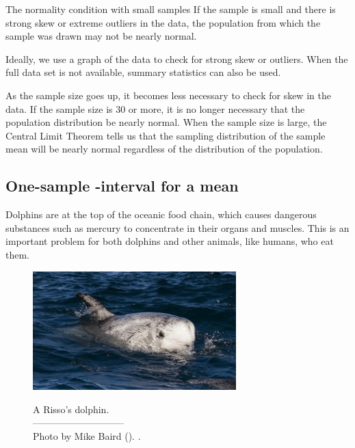 \begin{onebox}{The normality condition with small samples}
{If the sample is small and there is strong skew or extreme outliers in the data, the population from which the sample was drawn may not be nearly normal. }
\end{onebox}

Ideally, we use a graph of the data to check for strong skew or outliers.  When the full data set is not available, summary statistics can also be used. 

As the sample size goes up, it becomes less necessary to check for skew in the data.  If the sample size is 30 or more, it is no longer necessary that the population distribution be nearly normal.  When the sample size is large, the Central Limit Theorem tells us that the sampling distribution of the sample mean will be nearly normal regardless of the distribution of the population.



\subsection[One-sample $t$-interval for a mean]{One-sample -interval for a mean}
\label{oneSampleTConfidenceIntervals}


Dolphins are at the top of the oceanic food chain, which causes dangerous substances such as mercury to concentrate in their organs and muscles. This is an important problem for both dolphins and other animals, like humans, who eat them.
\setlength{\captionwidth}{86mm}

\begin{figure}[h]
\centering
\includegraphics[width=0.7\textwidth]{ch_inference_for_means/figures/rissosDolphin/rissosDolphin.jpg}  \\
\addvspace{2mm}
\begin{minipage}{\textwidth}
   \caption[rissosDolphinPic]{A Risso's dolphin.\vspace{-1mm} \\
   -----------------------------\vspace{-2mm}\\
   {\footnotesize Photo by Mike Baird (). .\vspace{-10mm}}}
   \label{rissosDolphin}
\end{minipage}
\vspace{3mm}
\end{figure}
\setlength{\captionwidth}{\mycaptionwidth}

